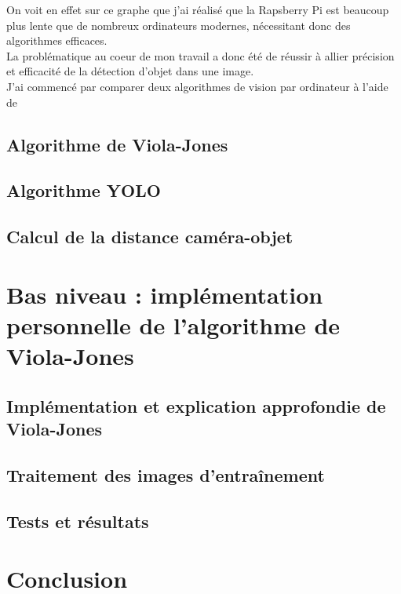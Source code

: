 \documentclass[12pt,a4paper]{article}
\begin{document}
    On voit en effet sur ce graphe que j'ai réalisé que la Rapsberry Pi est beaucoup plus lente que de nombreux ordinateurs modernes, nécessitant donc des algorithmes efficaces. \\

    La problématique au coeur de mon travail a donc été de réussir à allier précision et efficacité de la détection d'objet dans une image. \\

    J'ai commencé par comparer deux algorithmes de vision par ordinateur à l'aide de 


\subsection{Algorithme de Viola-Jones}


\subsection{Algorithme YOLO}


\subsection{Calcul de la distance caméra-objet}



\section{Bas niveau : implémentation  personnelle de l’algorithme de Viola-Jones}


\subsection{Implémentation et explication approfondie de Viola-Jones}


\subsection{Traitement des images d’entraînement}


\subsection{Tests et résultats}


\section{Conclusion}
\end{document}
